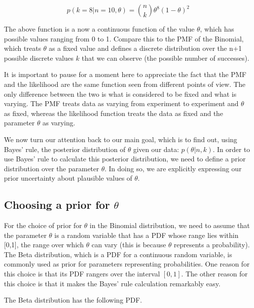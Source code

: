 \documentclass[12pt,]{krantz}
\theoremstyle{definition}
\theoremstyle{definition}
\theoremstyle{definition}
\theoremstyle{remark}
\begin{document}
\begin{equation}
p(k=8 | n= 10, \theta) = \binom{n}{k} \theta^8 (1-\theta)^{2}
\end{equation}

The above function is a now a continuous function of the value \(\theta\), which has possible values ranging from 0 to 1. Compare this to the PMF of the Binomial, which treats \(\theta\) as a fixed value and defines a discrete distribution over the n+1 possible discrete values \(k\) that we can observe (the possible number of successes).

It is important to pause for a moment here to appreciate the fact that the PMF and the likelihood are the same function seen from different points of view. The only difference between the two is what is considered to be fixed and what is varying. The PMF treats data as varying from experiment to experiment and \(\theta\) as fixed, whereas the likelihood function treats the data as fixed and the parameter \(\theta\) as varying.

We now turn our attention back to our main goal, which is to find out, using Bayes' rule, the posterior distribution of \(\theta\) given our data: \(p(\theta|n,k)\). In order to use Bayes' rule to calculate this posterior distribution, we need to define a prior distribution over the parameter \(\theta\). In doing so, we are explicitly expressing our prior uncertainty about plausible values of \(\theta\).

\hypertarget{choosing-a-prior-for-theta}{%
\subsection{\texorpdfstring{Choosing a prior for \(\theta\)}{Choosing a prior for \textbackslash{}theta}}\label{choosing-a-prior-for-theta}}

For the choice of prior for \(\theta\) in the Binomial distribution, we need to assume that the parameter \(\theta\) is a random variable that has a PDF whose range lies within {[}0,1{]}, the range over which \(\theta\) can vary (this is because \(\theta\) represents a probability). The Beta distribution, which is a PDF for a continuous random variable, is commonly used as prior for parameters representing probabilities. One reason for this choice is that its PDF rangers over the interval \([0,1]\). The other reason for this choice is that it makes the Bayes' rule calculation remarkably easy.

The Beta distribution has the following PDF.
\end{document}
